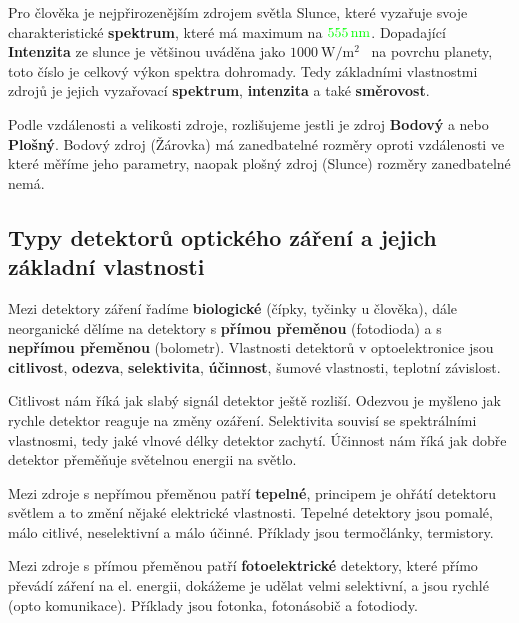 \documentclass[a4paper, 12pt]{article}
\begin{document}
            Pro člověka je nejpřirozenějším zdrojem světla Slunce, které vyzařuje svoje charakteristické \textbf{spektrum},
            které má maximum na $\textcolor{green}{\qty{555}{\nano\meter}}$. Dopadající \textbf{Intenzita} ze slunce je většinou uváděna
            jako $\qty{1000}{\watt / \meter\squared}$~\cite{pveducation_solar_spectra} na povrchu planety, toto číslo je celkový výkon
            spektra dohromady. Tedy základními vlastnostmi zdrojů je jejich vyzařovací \textbf{spektrum}, \textbf{intenzita} a také \textbf{směrovost}. 

            Podle vzdálenosti a velikosti zdroje, rozlišujeme jestli je zdroj \textbf{Bodový} a nebo \textbf{Plošný}. Bodový zdroj (Žárovka) má zanedbatelné
            rozměry oproti vzdálenosti ve které měříme jeho parametry, naopak plošný zdroj (Slunce) rozměry zanedbatelné nemá.

        \subsection{Typy detektorů optického záření a jejich základní vlastnosti}
            Mezi detektory záření řadíme \textbf{biologické} (čípky, tyčinky u člověka), dále neorganické dělíme na
            detektory s \textbf{přímou přeměnou} (fotodioda) a s \textbf{nepřímou přeměnou} (bolometr).
            Vlastnosti detektorů v optoelektronice jsou \textbf{citlivost}, \textbf{odezva}, \textbf{selektivita}, 
            \textbf{účinnost}, šumové vlastnosti, teplotní závislost.
            
            Citlivost nám říká jak slabý signál detektor ještě rozliší. Odezvou je myšleno jak rychle detektor reaguje na změny ozáření.
            Selektivita souvisí se spektrálními vlastnosmi, tedy jaké vlnové délky detektor zachytí. Účinnost nám říká jak
            dobře detektor přeměňuje světelnou energii na světlo.

            Mezi zdroje s nepřímou přeměnou patří \textbf{tepelné}, principem je ohřátí detektoru světlem a to změní nějaké elektrické vlastnosti.
            Tepelné detektory jsou pomalé, málo citlivé, neselektivní a málo účinné. Příklady jsou termočlánky, termistory.
            
            Mezi zdroje s přímou přeměnou patří \textbf{fotoelektrické} detektory, které přímo převádí záření na el. energii, dokážeme je udělat velmi selektivní,
            a jsou rychlé (opto komunikace). Příklady jsou fotonka, fotonásobič a fotodiody.   
\end{document}
